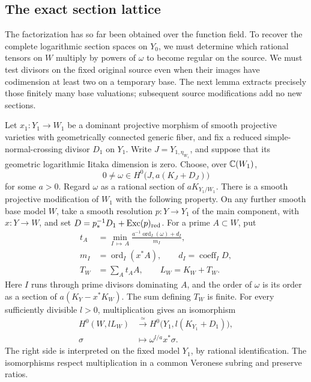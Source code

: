 \subsection{The exact section lattice}

The factorization has so far been obtained over the function field.
To recover the complete logarithmic section spaces on $Y_0$, we must
determine which rational tensors on $W$ multiply by powers of $\omega$
to become regular on the source.  We must test divisors on the fixed
original source even when their images have codimension at least two
on a temporary base. The next lemma extracts precisely those finitely many
base valuations; subsequent source modifications add no new sections.

\begin{lemma}
\label{lem:valuation-preparation}
Let \(x_1:Y_1\to W_1\) be a dominant projective morphism of smooth
projective varieties with geometrically connected generic fiber, and fix
a reduced simple-normal-crossing divisor
\(D_1\) on \(Y_1\).  Write \(J=Y_{1,\eta_{W_1}}\), and suppose that its geometric
logarithmic Iitaka dimension is zero.  Choose, over \(\mathbb C(W_1)\),
\[
 0\ne\omega\in H^0\bigl(J,a(K_J+D_J)\bigr)
\]
for some \(a>0\).  Regard \(\omega\) as a rational section of
\(aK_{Y_1/W_1}\).  There is a smooth projective modification of \(W_1\)
with the following property.  On any further smooth base model \(W\),
take a smooth resolution \(p:Y\to Y_1\) of the main component, with
\(x:Y\to W\), and set \(D=p_*^{-1}D_1+\operatorname{Exc}(p)_{\rm red}\).
For a prime \(A\subset W\), put
\begin{equation}\label{eq:iitaka-minimum}
 \begin{aligned}
 t_A&=\min_{I\,\mapsto\,A}
       \frac{a^{-1}\operatorname{ord}_I(\omega)+d_I}{m_I},\\
 m_I&=\operatorname{ord}_I(x^*A),
       \qquad d_I=\operatorname{coeff}_I D,\\
 T_W&=\sum_A t_AA,\qquad L_W=K_W+T_W.
 \end{aligned}
\end{equation}
Here \(I\) runs through prime divisors dominating \(A\), and the order
of \(\omega\) is its order as a section of \(a(K_Y-x^*K_W)\).
The sum defining \(T_W\) is finite.  For every sufficiently divisible
\(l>0\), multiplication gives an isomorphism
\begin{equation}\label{eq:iitaka-exact-sections}
 \begin{split}
 H^0(W,lL_W)&\xrightarrow{\ \simeq\ }
       H^0\bigl(Y_1,l(K_{Y_1}+D_1)\bigr),\\
 \sigma&\longmapsto \omega^{l/a}x^*\sigma.
 \end{split}
\end{equation}
The right side is interpreted on the fixed model \(Y_1\), by rational
identification.  The isomorphisms respect multiplication in a common
Veronese subring and preserve ratios.
\end{lemma}

